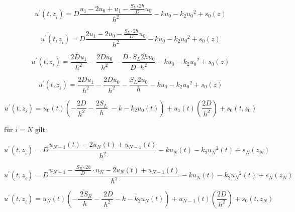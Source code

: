 \begin{equation}
u^{\prime } \left(t{,z}_i \right)=D\frac{u_1 -{2u}_0 +u_1 -\frac{S_L \cdot 2h}{D}u_0 }{h^2 }-ku_0 -k_2 {u_0 }^2 +s_0 \left(z\right)	
\end{equation}

\begin{equation}
	u^{\prime } \left(t{,z}_i \right)=D\frac{2u_1 -{2u}_0 -\frac{S_L \cdot 2h}{D}u_0 }{h^2 }-ku_0 -k_2 {u_0 }^2 +s_0 \left(z\right)
\end{equation}

\begin{equation}
	u^{\prime } \left(t{,z}_i \right)=\frac{2{Du}_1 }{h^2 }-\frac{2{Du}_0 }{h^2 }-\frac{D\cdot S_L 2{hu}_0 }{D\cdot h^2 }-ku_0 -k_2 {u_0 }^2 +s_0 \left(z\right)
\end{equation}

\begin{equation}
	u^{\prime } \left(t{,z}_i \right)=\frac{2{Du}_1 }{h^2 }-\frac{2{Du}_0 }{h^2 }-\frac{S_L 2u_0 }{h}-ku_0 -k_2 {u_0 }^2 +s_0 \left(z\right)
\end{equation}

\begin{equation}
	u^{\prime } \left(t{,z}_i \right)=u_0 \left(t\right)\left(-\frac{2D}{h^2 }-\frac{{2S}_L }{h}\;-k-k_2 u_0 \left(t\right)\right)+u_1 \left(t\right)\left(\frac{2D}{h^2 }\right)+s_0 \left(t,z_0 \right)
\end{equation}


für $ i = N $ gilt:

\begin{equation}
	u^{\prime } \left(t{,z}_i \right)=D\frac{u_{N+1} \left(t\right)-{2u}_N \left(t\right)+u_{N-1} \left(t\right)}{h^2 }-ku_N \left(t\right)-k_2 {u_N }^2 \left(t\right)+s_N \left(z_N \right)
\end{equation}


\begin{equation}
	u^{\prime } \left(t{,z}_i \right)=D\frac{u_{N-1} -\frac{\;S_R \cdot 2h}{D}\cdot u_N -{2u}_N \left(t\right)+u_{N-1} \left(t\right)}{h^2 }-ku_N \left(t\right)-k_2 {u_N }^2 \left(t\right)+s_N \left(z_N \right)	
\end{equation}
	
	
\begin{equation}
	u^{\prime } \left(t{,z}_i \right)=u_N \left(t\right)\left(-\frac{\;2S_R }{h}-\frac{\;2D}{h^2 }-k-k_2 u_N \left(t\right)\right)+u_{N-1} \left(t\right)\left(\frac{2D}{h^2 }\right)+s_0 \left(t,z_N \right)	
\end{equation}

